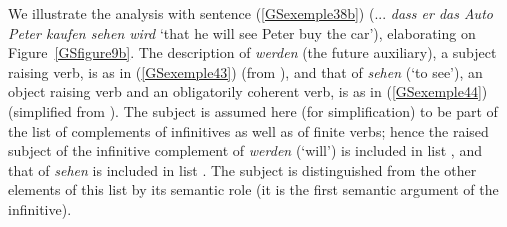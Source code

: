 \documentclass[output=paper
	        ,collection
	        ,collectionchapter
 	        ,biblatex
                ,babelshorthands
                ,newtxmath
                ,draftmode
                ,colorlinks, citecolor=brown
]{langscibook}
\begin{document}
{\begin{exe}
\end{exe}

We illustrate the analysis with sentence (\ref{GSexemple38b}) (... \emph{dass er das Auto Peter kaufen sehen wird} `that he will see Peter buy the car’), elaborating on Figure~\ref{GSfigure9b}. The description of \emph{werden} (the future auxiliary), a subject raising verb, is as in (\ref{GSexemple43}) (from \citealt[39]{muller2018clause}), and that of \emph{sehen} (`to see'), an object raising verb and an obligatorily coherent verb, is as in (\ref{GSexemple44}) (simplified from \citealt[102]{Mueller2002b}). The subject is assumed here (for simplification) to be part of the list of complements of infinitives as well as of finite verbs; hence the raised subject of the infinitive complement of \emph{werden} (`will') is included in list , and that of \emph{sehen} is included in list . The subject is distinguished from the other elements of this list by its semantic role (it is the first semantic argument of the infinitive).     

\begin{exe}
    \label{GSexemple43}
\end{exe}

\begin{exe}
    \label{GSexemple44}
\end{exe}

}
\end{document}
